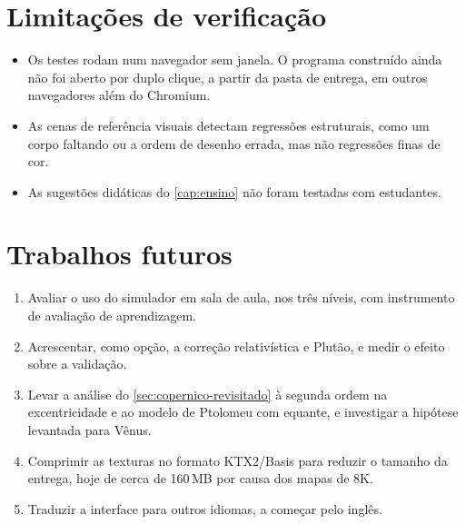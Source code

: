 \section{Limitações de verificação}

\begin{itemize}
  \item Os testes rodam num navegador sem janela. O programa construído ainda não foi aberto por duplo clique, a partir da pasta de entrega, em outros navegadores além do Chromium.
  \item As cenas de referência visuais detectam regressões estruturais, como um corpo faltando ou a ordem de desenho errada, mas não regressões finas de cor.
  \item As sugestões didáticas do \autoref{cap:ensino} não foram testadas com estudantes.
\end{itemize}

\section{Trabalhos futuros}

\begin{enumerate}
  \item Avaliar o uso do simulador em sala de aula, nos três níveis, com instrumento de avaliação de aprendizagem.
  \item Acrescentar, como opção, a correção relativística e Plutão, e medir o efeito sobre a validação.
  \item Levar a análise do \autoref{sec:copernico-revisitado} à segunda ordem na excentricidade e ao modelo de Ptolomeu com equante, e investigar a hipótese levantada para Vênus.
  \item Comprimir as texturas no formato KTX2/Basis para reduzir o tamanho da entrega, hoje de cerca de 160\,MB por causa dos mapas de 8K.
  \item Traduzir a interface para outros idiomas, a começar pelo inglês.
\end{enumerate}
